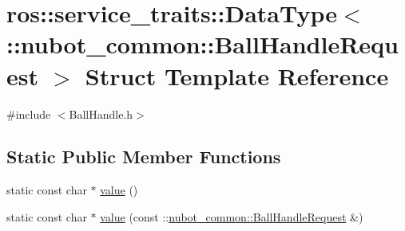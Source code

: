 \hypertarget{structros_1_1service__traits_1_1DataType_3_01_1_1nubot__common_1_1BallHandleRequest_01_4}{\section{ros\-:\-:service\-\_\-traits\-:\-:Data\-Type$<$ \-:\-:nubot\-\_\-common\-:\-:Ball\-Handle\-Request $>$ Struct Template Reference}
\label{structros_1_1service__traits_1_1DataType_3_01_1_1nubot__common_1_1BallHandleRequest_01_4}
}


{\ttfamily \#include $<$Ball\-Handle.\-h$>$}

\subsection*{Static Public Member Functions}
\begin{DoxyCompactItemize}
\item 
static const char $\ast$ \hyperlink{structros_1_1service__traits_1_1DataType_3_01_1_1nubot__common_1_1BallHandleRequest_01_4_af3b155b8cb71f4affa8cc6fae62e311d}{value} ()
\item 
static const char $\ast$ \hyperlink{structros_1_1service__traits_1_1DataType_3_01_1_1nubot__common_1_1BallHandleRequest_01_4_a91a805430c8d32de16ac9d52cb2b4955}{value} (const \-::\hyperlink{namespacenubot__common_a47b9531f744aace81704d183c8f37107}{nubot\-\_\-common\-::\-Ball\-Handle\-Request} \&)
\end{DoxyCompactItemize}


